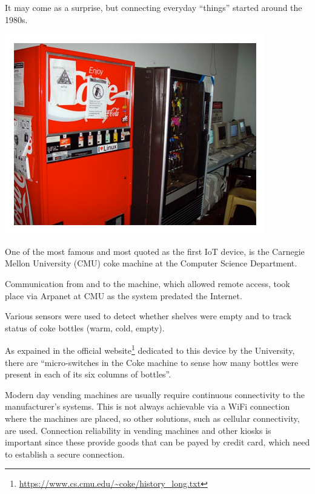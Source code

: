 		It may come as a surprise, but connecting everyday ``things'' started around the 1980s.
		
		\noindent
		\begin{minipage}{0.5\textwidth}%
			\centering
			\includegraphics[width=\textwidth]{resources/img/coke}
		\end{minipage}%
		\hfill%
		\begin{minipage}{0.5\textwidth}\raggedright
			One of the most famous and most quoted as the first IoT device, is the Carnegie Mellon University (CMU) coke machine at the Computer Science Department.

			Communication from and to the machine, which allowed remote access, took place via Arpanet at CMU as the system predated the Internet.
		\end{minipage}
		\newline
		
		Various sensors were used to detect whether shelves were empty and to track status of coke bottles (warm, cold, empty).
		
		As expained in the official website\footnote{\url{https://www.cs.cmu.edu/~coke/history_long.txt}} dedicated to this device by the University, there are ``micro-switches in the Coke machine to sense how many bottles were present in each of its six columns of bottles''.
	
		Modern day vending machines are usually require continuous connectivity to the manufacturer's systems.
		This is not always achievable via a WiFi connection where the machines are placed, so other solutions, such as cellular connectivity, are used.
		Connection reliability in vending machines and other kiosks is important since these provide goods that can be payed by credit card, which need to establish a secure connection.
		
